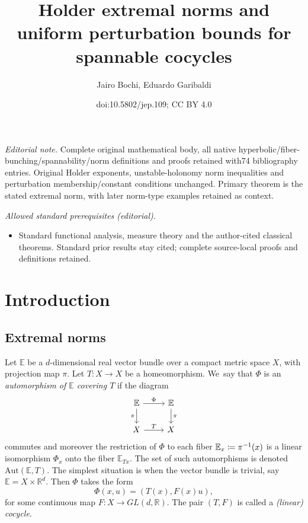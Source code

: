 \documentclass[10pt]{amsart}
\title{Holder extremal norms and uniform perturbation bounds for spannable cocycles}
\author{Jairo Bochi, Eduardo Garibaldi}
\date{doi:10.5802/jep.109; CC BY 4.0}
\def\vcentcolon{\mathrel{\mathop\ordinarycolon}}
\providecommand\ordinarycolon{:}
\providecommand*\coloneqq{\vcentcolon\mathrel{\mkern-1.2mu}=}
\theoremstyle{plain}
\theoremstyle{definition}
\newcommand{\RR}{\mathbb{R}}
\newcommand{\EE}{\mathbb{E}}
\newcommand{\GL}{\mathit{GL}}
\newcommand{\Aut}{\mathrm{Aut}}
\begin{document}
\maketitle
\noindent\textit{Editorial note.} Complete original mathematical body, all native hyperbolic/fiber-bunching/spannability/norm definitions and proofs retained with74 bibliography entries. Original Holder exponents, unstable-holonomy norm inequalities and perturbation membership/constant conditions unchanged. Primary theorem is the stated extremal norm, with later norm-type examples retained as context.\par\medskip
\noindent\textit{Allowed standard prerequisites (editorial).}\begin{itemize}
\item Standard functional analysis, measure theory and the author-cited classical theorems. Standard prior results stay cited; complete source-local proofs and definitions retained.
\end{itemize}\medskip

\tableofcontents


\section{Introduction}

\subsection{Extremal norms}\label{ss.intro_extremal}

Let $\EE$ be a $d$-dimensional real vector bundle over a compact metric space $X$, with projection map $\pi$.
Let $T \colon X \to X$ be a homeomorphism.
We~say that $\Phi$ is an \emph{automorphism of $\EE$ covering $T$} if
the diagram
\[
\begin{tikzcd}
\EE	\arrow[r,"\Phi"] \arrow[d,swap,"\pi"]	& \EE \arrow[d,"\pi"] \\
X	\arrow[r,"T"]						& X
\end{tikzcd}
\]
commutes and moreover the restriction of $\Phi$ to each fiber $\EE_x \coloneqq \pi^{-1}(x)$ is a linear isomorphism $\Phi_x$ onto the fiber $\EE_{Tx}$.
The set of such automorphisms is denoted $\Aut(\EE,T)$.
The simplest situation is when the vector bundle is trivial, say $\EE = X \times \RR^d$.
Then $\Phi$ takes the form
\begin{equation}\label{e.cocycle}
\Phi(x,u) = (T(x),F(x)u),
\end{equation}
for some continuous map $F \colon X \to \GL(d,\RR)$.
The pair $(T,F)$ is called a \emph{(linear) cocycle}.
\end{document}
